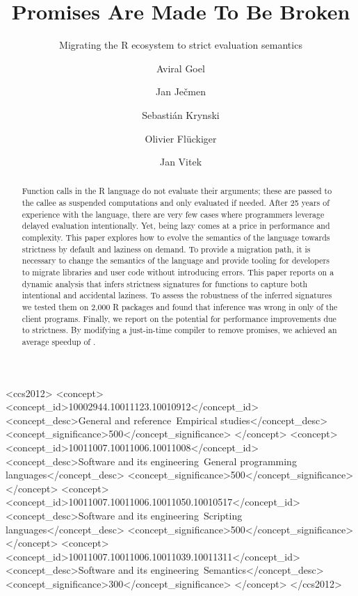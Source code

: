 \documentclass[review,nonacm,screen,acmsmall,anonymous=true]{acmart}
\begin{document}
\title{Promises Are Made To Be Broken}
\subtitle{Migrating the R ecosystem to strict evaluation semantics}

\author{Aviral Goel}
\author{Jan Ječmen}
\author{Sebastián Krynski}
\author{Olivier Flückiger}
\author{Jan Vitek}
\authorsaddresses{}
\renewcommand{\shortauthors}{Goel, et al.}

\begin{abstract}
  Function calls in the R language do not evaluate their arguments; these are
  passed to the callee as suspended computations and only evaluated if needed.
  After 25 years of experience with the language, there are very few cases where
  programmers leverage delayed evaluation intentionally. Yet, being lazy comes
  at a price in performance and complexity. This paper explores how to evolve
  the semantics of the language towards strictness by default and laziness on
  demand. To provide a migration path, it is necessary to change the semantics
  of the language and provide tooling for developers to migrate libraries and
  user code without introducing errors. This paper reports on a dynamic analysis
  that infers strictness signatures for functions to capture both intentional
  and accidental laziness. To assess the robustness of the inferred signatures
  we tested them on 2,000 R packages and found that inference was wrong in only
  \robustnesResult of the client programs. Finally, we report on the potential for
  performance improvements due to strictness. By modifying a just-in-time
  compiler to remove promises, we achieved an average speedup of
  \speedupRshStrict.
\end{abstract}

\begin{CCSXML}
<ccs2012>
<concept>
<concept_id>10002944.10011123.10010912</concept_id>
<concept_desc>General and reference~Empirical studies</concept_desc>
<concept_significance>500</concept_significance>
</concept>
<concept>
<concept_id>10011007.10011006.10011008</concept_id>
<concept_desc>Software and its engineering~General programming languages</concept_desc>
<concept_significance>500</concept_significance>
</concept>
<concept>
<concept_id>10011007.10011006.10011050.10010517</concept_id>
<concept_desc>Software and its engineering~Scripting languages</concept_desc>
<concept_significance>500</concept_significance>
</concept>
<concept>
<concept_id>10011007.10011006.10011039.10011311</concept_id>
<concept_desc>Software and its engineering~Semantics</concept_desc>
<concept_significance>300</concept_significance>
</concept>
</ccs2012>
\end{CCSXML}
\end{document}
